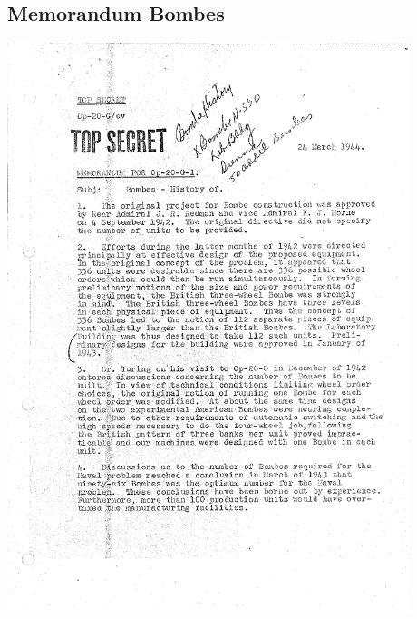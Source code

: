\documentclass[%
<<<<<<< Updated upstream
11pt,%
twoside,%
titlepage,%
german,%
headsepline%
]{scrartcl}
\begin{document}
\begin{cdef}[Linksverschiebung]{}
\begin{cdef}{}
\clearpage

\appendix

\section{Memorandum Bombes}
\includegraphics[width=0.88\textwidth,page=1]{pictures/memorandumbombes.pdf}


\end{cdef}
\end{cdef}
\end{document}
